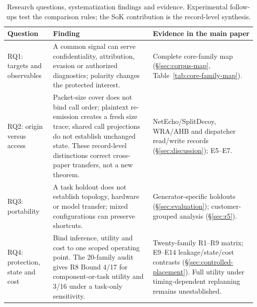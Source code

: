 \begin{table}[t]\centering\footnotesize
\caption{Research questions, systematization findings and evidence. Experimental follow-ups test the comparison rules; the SoK contribution is the record-level synthesis.}\label{tab:rq-findings}
\begin{tabularx}{\textwidth}{@{}p{}YY@{}}\toprule
Question & Finding & Evidence in the main paper\\\midrule
RQ1: targets and observables & A common signal can serve confidentiality, attribution, evasion or authorized diagnostics; polarity changes the protected interest. & Complete core-family map (\S\ref{sec:corpus-map}, Table~\ref{tab:core-family-map}).\\
RQ2: origin versus access & Packet-size cover does not bind call order; plaintext re-emission creates a fresh size trace; shared call projections do not establish unchanged state. These record-level distinctions correct cross-paper transfers, not a new theorem. & NetEcho/SplitDecoy, WRA/AHB and dispatcher read/write records (\S\ref{sec:discussion}); E5--E7.\\
RQ3: portability & A task holdout does not establish topology, hardware or model transfer; mixed configurations can preserve shortcuts. & Generator-specific holdouts (\S\ref{sec:evaluation}); customer-grouped analysis (\S\ref{sec:r5}).\\
RQ4: protection, state and cost & Bind inference, utility and cost to one scoped operating point. The 20-family audit gives R8 Bound 4/17 for component-or-task utility and 3/16 under a task-only sensitivity. & Twenty-family R1--R9 matrix; E9--E14 leakage/state/cost contrasts (\S\ref{sec:controlled-placement}). Full utility under timing-dependent replanning remains unestablished.\\\bottomrule
\end{tabularx}\end{table}
